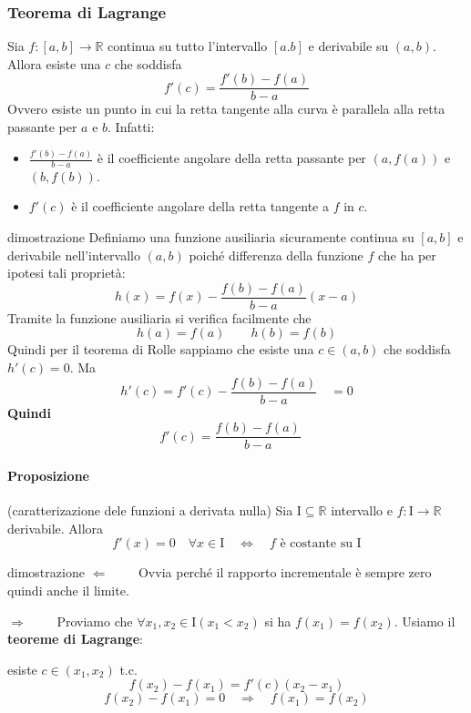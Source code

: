 \documentclass[x11names]{article}
\begin{document}
	\begin{center}
		\colorbox{myred}{\begin{minipage}{5.75in}
				\begin{redes}{}
					\subsubsection{Teorema di Lagrange}
					Sia $f: [a,b] \to \mathbb{R}$ continua su tutto l'intervallo $[a.b]$ e derivabile su $(a,b)$. Allora esiste una $c$ che soddisfa
					\[
					f'(c) = \frac{f'(b) - f(a)}{b - a}
					\]
					Ovvero esiste un punto in cui la retta tangente alla curva è parallela alla retta passante per $a$ e $b$. Infatti:
					\begin{itemize}
						\item $\frac{f'(b) - f(a)}{b - a}$ è il coefficiente angolare della retta passante per $(a,f(a))$ e $(b,f(b))$.
						\item $f'(c)$ è il coefficiente angolare della retta tangente  a $f$ in $c$.
					\end{itemize}
				\end{redes}
		\end{minipage}}        
	\end{center}
	\begin{es}{dimostrazione}
		Definiamo una funzione ausiliaria sicuramente continua su $[a,b]$ e derivabile nell'intervallo $(a,b)$ poiché differenza della funzione $f$ che ha per ipotesi tali proprietà:
		\[
		h(x) = f(x) - \frac{f(b) - f(a)}{b - a}(x-a)
		\]
		Tramite la funzione ausiliaria si verifica facilmente che 
		\[
		h(a) = f(a) \qquad h(b) = f(b)
		\]
		Quindi per il teorema di Rolle sappiamo che esiste una $c \in (a,b)$ che soddisfa $h'(c) = 0$. Ma 
		\[
		h'(c) = f'(c) - \frac{f(b) - f(a)}{b - a} \quad = 0
		\]
		\textbf{Quindi}
		\[
		f'(c) = \frac{f(b) - f(a)}{b - a} \quad 
		\]
	\end{es}
	\paragraph{Proposizione} (caratterizazione dele funzioni a derivata nulla)
	Sia I$\subseteq \mathbb{R}$ intervallo e $f: \text{I} \to \mathbb{R}$ derivabile. Allora
	\[
	f'(x) = 0 \quad \forall x \in \text{I} \quad \Longleftrightarrow \quad f \text{ è costante su I}
	\]
	\begin{es}{dimostrazione}
		$\Longleftarrow \qquad$ Ovvia perché il rapporto incrementale è sempre zero quindi anche il limite.
		
		$\Longrightarrow \qquad$ Proviamo che $\forall x_1,x_2 \in$I$(x_1 < x_2)$ si  ha $f(x_1) = f(x_2)$.
		Usiamo il \textbf{teoreme di Lagrange}:
		
		esiste $c \in (x_1,x_2)$ t.c.
		\[
		f(x_2) - f(x_1) = f'(c)(x_2 - x_1)
		\]
		\[
		f(x_2) - f(x_1) = 0 \quad \Longrightarrow \quad f(x_1) = f(x_2)
		\]
	\end{es}
	
\end{document}
